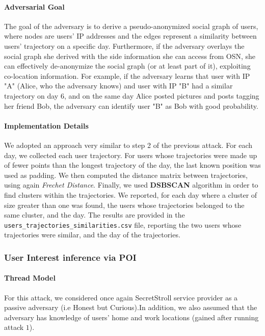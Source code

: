 \documentclass[10pt,conference,compsocconf]{IEEEtran}
\begin{document}
\paragraph{Adversarial Goal}
The goal of the adversary is to derive a pseudo-anonymized social graph of users, where nodes are users' IP addresses and the edges represent a similarity between users' trajectory on a specific day. Furthermore, if the adversary overlays the social graph she derived with the side information she can access from OSN, she can effectively de-anonymize the social graph (or at least part of it), exploiting co-location information. For example, if the adversary learns that user with IP "A" (Alice, who the adversary knows) and user with IP "B" had a similar trajectory on day 6, and on the same day Alice posted pictures and posts tagging her friend Bob, the adversary can identify user "B" as Bob with good probability.

\paragraph{Implementation Details}
We adopted an approach very similar to step 2 of the previous attack. For each
day, we collected each user trajectory. For users whose trajectories were made
up of fewer points than the longest trajectory of the day, the last known
position was used as padding. We then computed the distance matrix between
trajectories, using again \textit{Frechet Distance}. Finally, we used
\textbf{DSBSCAN} algorithm in order to find clusters within the trajectories. We
reported, for each day where a cluster of size greater than one was found, the
users whose trajectories belonged to the same cluster, and the day. The results
are provided in the \texttt{users\_trajectories\_similarities.csv} file, reporting the two users whose trajectories were similar, and the day of the trajectories.

\subsubsection{User Interest inference via POI}
\paragraph{Thread Model}
For this attack, we considered once again SecretStroll service provider as a passive adversary (i.e Honest but
Curious).In addition, we also assumed that the adversary has knowledge of users'
home and work locations (gained after running attack $1$).
\end{document}
